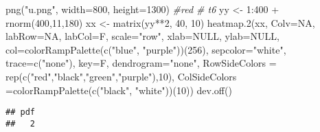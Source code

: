 \documentclass[
]{article}
\newenvironment{Shaded}{\begin{snugshade}}{\end{snugshade}}
\newcommand{\AttributeTok}[1]{\textcolor[rgb]{0.77,0.63,0.00}{#1}}
\newcommand{\CommentTok}[1]{\textcolor[rgb]{0.56,0.35,0.01}{\textit{#1}}}
\newcommand{\ConstantTok}[1]{\textcolor[rgb]{0.00,0.00,0.00}{#1}}
\newcommand{\DecValTok}[1]{\textcolor[rgb]{0.00,0.00,0.81}{#1}}
\newcommand{\FunctionTok}[1]{\textcolor[rgb]{0.00,0.00,0.00}{#1}}
\newcommand{\NormalTok}[1]{#1}
\newcommand{\OtherTok}[1]{\textcolor[rgb]{0.56,0.35,0.01}{#1}}
\newcommand{\SpecialCharTok}[1]{\textcolor[rgb]{0.00,0.00,0.00}{#1}}
\newcommand{\StringTok}[1]{\textcolor[rgb]{0.31,0.60,0.02}{#1}}
\begin{document}
\begin{Shaded}
\begin{Highlighting}[]
\FunctionTok{png}\NormalTok{(}\StringTok{"u.png"}\NormalTok{, }\AttributeTok{width=}\DecValTok{800}\NormalTok{, }\AttributeTok{height=}\DecValTok{1300}\NormalTok{) }\CommentTok{\#red \# t6}
\NormalTok{yy }\OtherTok{\textless{}{-}} \DecValTok{1}\SpecialCharTok{:}\DecValTok{400} \SpecialCharTok{+} \FunctionTok{rnorm}\NormalTok{(}\DecValTok{400}\NormalTok{,}\DecValTok{11}\NormalTok{,}\DecValTok{180}\NormalTok{)}
\NormalTok{xx }\OtherTok{\textless{}{-}} \FunctionTok{matrix}\NormalTok{(yy}\SpecialCharTok{**}\DecValTok{2}\NormalTok{, }\DecValTok{40}\NormalTok{, }\DecValTok{10}\NormalTok{)}
\FunctionTok{heatmap.2}\NormalTok{(xx, }\AttributeTok{Colv=}\ConstantTok{NA}\NormalTok{, }\AttributeTok{labRow=}\ConstantTok{NA}\NormalTok{, }\AttributeTok{labCol=}\NormalTok{F, }\AttributeTok{scale=}\StringTok{"row"}\NormalTok{, }\AttributeTok{xlab=}\ConstantTok{NULL}\NormalTok{,}
          \AttributeTok{ylab=}\ConstantTok{NULL}\NormalTok{, }\AttributeTok{col=}\FunctionTok{colorRampPalette}\NormalTok{(}\FunctionTok{c}\NormalTok{(}\StringTok{"blue"}\NormalTok{, }\StringTok{"purple"}\NormalTok{))(}\DecValTok{256}\NormalTok{),  }
        \AttributeTok{sepcolor=}\StringTok{"white"}\NormalTok{, }\AttributeTok{trace=}\FunctionTok{c}\NormalTok{(}\StringTok{"none"}\NormalTok{), }\AttributeTok{key=}\NormalTok{F, }\AttributeTok{dendrogram=}\StringTok{"none"}\NormalTok{,}
        \AttributeTok{RowSideColors =} \FunctionTok{rep}\NormalTok{(}\FunctionTok{c}\NormalTok{(}\StringTok{"red"}\NormalTok{,}\StringTok{"black"}\NormalTok{,}\StringTok{"green"}\NormalTok{,}\StringTok{"purple"}\NormalTok{),}\DecValTok{10}\NormalTok{),}
        \AttributeTok{ColSideColors =}\FunctionTok{colorRampPalette}\NormalTok{(}\FunctionTok{c}\NormalTok{(}\StringTok{"black"}\NormalTok{, }\StringTok{"white"}\NormalTok{))(}\DecValTok{10}\NormalTok{))}
\FunctionTok{dev.off}\NormalTok{()}
\end{Highlighting}
\end{Shaded}

\begin{verbatim}
## pdf 
##   2
\end{verbatim}
\end{document}
